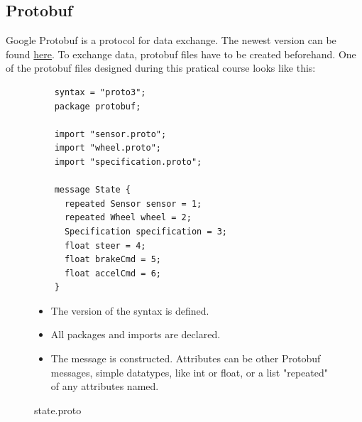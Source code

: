 \documentclass[paper=a4, fontsize=11pt]{scrreprt}
\begin{document}
  \subsection{Protobuf}
Google Protobuf is a protocol for data exchange.
The newest version can be found \href{https://github.com/google/protobuf}{here}.
To exchange data, protobuf files have to be created beforehand.
One of the protobuf files designed during this pratical course looks like this:
  \begin{figure}[!h]
  \begin{minipage}{0.5\textwidth}
  \centering
    \begin{verbatim}
	syntax = "proto3";
	package protobuf;

	import "sensor.proto";
	import "wheel.proto";
	import "specification.proto";

	message State {
	  repeated Sensor sensor = 1;
	  repeated Wheel wheel = 2;
	  Specification specification = 3;
	  float steer = 4;
	  float brakeCmd = 5;
	  float accelCmd = 6;
	}
    \end{verbatim}
  \end{minipage}
  \begin{minipage}{0.5\textwidth}
    \begin{itemize}
\item The version of the syntax is defined.
\item All packages and imports are declared.
\item The message is constructed. Attributes can be other Protobuf messages, simple datatypes, like int or float, or a list "repeated" of any attributes named.
    \end{itemize}
  \end{minipage}
    \caption{\tiny state.proto}
  \end{figure}
\end{document}
